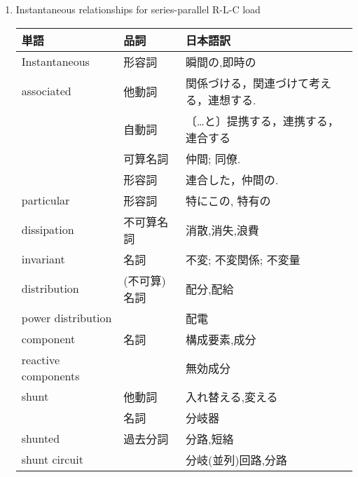 \documentclass[fleqn,9pt,a4paper,dvipdfmx]{jsarticle}
\begin{document}
  \begin{enumerate}
    \item Instantaneous relationships for series-parallel R-L-C load
  
  \begin{table}[h]
    \begin{tabular}{l|ll}
    単語            & 品詞    & 日本語訳                 \\ \hline
    Instantaneous & 形容詞   & 瞬間の,即時の              \\ \hline
    associated    & 他動詞   & 関係づける，関連づけて考える，連想する. \\ \hline
                  & 自動詞   & 〔…と〕提携する，連携する，連合する   \\
                  & 可算名詞  & 仲間; 同僚.              \\
                  & 形容詞   & 連合した，仲間の.            \\ \hline
    particular    & 形容詞   & 特にこの, 特有の            \\ \hline
    dissipation   & 不可算名詞 & 消散,消失,浪費             \\ \hline
    invariant     & 名詞    & 不変; 不変関係; 不変量       \\ \hline
    distribution        & (不可算)名詞 & 配分,配給      \\
    power distribution  &         & 配電                \\ \hline
    component           & 名詞      & 構成要素,成分     \\
    reactive components &         & 無効成分            \\ \hline
    shunt               & 他動詞  & 入れ替える,変える   \\
                        & 名詞    & 分岐器              \\
    shunted             & 過去分詞& 分路,短絡           \\ 
    shunt circuit       &         & 分岐(並列)回路,分路 \\ \hline
    \end{tabular}
    \end{table}
    \newpage


\end{enumerate}
\end{document}
